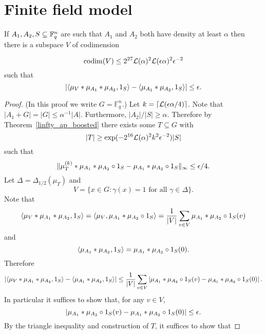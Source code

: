 \chapter{Finite field model}

\begin{theorem}\label{ap_in_ff}
If $A_1,A_2,S\subseteq \mathbb{F}_q^n$ are such that $A_1$ and $A_2$ both have density at least $\alpha$ then there is a subspace $V$ of codimension

\[\mathrm{codim}(V)\leq 2^{27}\mathcal{L}{(}\alpha)^2\mathcal{L}{(}\epsilon \alpha)^2\epsilon^{-2}\]
such that
\[\left\lvert \langle \mu_V\ast \mu_{A_1}\ast \mu_{A_2},1_{S}\rangle-\langle \mu_{A_1}\ast \mu_{A_2},1_{S}\rangle\right\rvert\leq \epsilon.\]
\end{theorem}

\begin{proof}
(In this proof we write $G=\mathbb{F}_q^n$.) Let $k=\lceil \mathcal{L}{(}\epsilon\alpha/4)\rceil$. Note that $\lvert A_1+G\rvert=\lvert G\rvert\leq \alpha^{-1}\lvert A\rvert$. Furthermore, $\lvert A_2\rvert/\lvert S\rvert\geq \alpha$. Therefore by Theorem~\ref{linfty_ap_boosted} there exists some $T\subseteq G$ with
\[\lvert T\rvert \geq \exp(-2^{16}\mathcal{L}{(}\alpha)^2k^2\epsilon^{-2})\lvert S\rvert\]
such that
\[\| \mu_T^{(k)}\ast \mu_{A_1}\ast \mu_{A_2}\circ 1_{S}-\mu_{A_1}\ast \mu_{A_2}\circ 1_{S}\|_{\infty}\leq \epsilon/4.\]
Let $\Delta=\Delta_{1/2}(\mu_T)$ and
\[V = \{ x \in G : \gamma(x)=1\textrm{ for all }\gamma\in\Delta\}.\]
Note that
\[\langle \mu_V\ast \mu_{A_1}\ast \mu_{A_2},1_{S}\rangle = \langle \mu_V,\mu_{A_1}\ast \mu_{A_2}\circ 1_{S}\rangle=\frac{1}{\left\lvert V\right\rvert}\sum_{v\in V}\mu_{A_1}\ast \mu_{A_2}\circ 1_{S}(v)\]
and
\[\langle \mu_{A_1}\ast \mu_{A_2},1_{S}\rangle = \mu_{A_1}\ast \mu_{A_2}\circ1_{S}(0).\]
Therefore
\[\left\lvert \langle \mu_V\ast \mu_{A_1}\ast \mu_{A_2},1_{S}\rangle-\langle \mu_{A_1}\ast \mu_{A_2},1_{S}\rangle\right\rvert\leq \frac{1}{\left\lvert V\right\rvert}\sum_{v\in V}\left\lvert \mu_{A_1}\ast \mu_{A_2}\circ 1_{S}(v)-\mu_{A_1}\ast \mu_{A_2}\circ 1_{S}(0)\right\rvert.\]
In particular it suffices to show that, for any $v\in V$,
\[\left\lvert \mu_{A_1}\ast \mu_{A_2}\circ 1_{S}(v)-\mu_{A_1}\ast \mu_{A_2}\circ 1_{S}(0)\right\rvert\leq \epsilon.\]
By the triangle inequality and construction of $T$, it suffices to show that


\end{proof}
